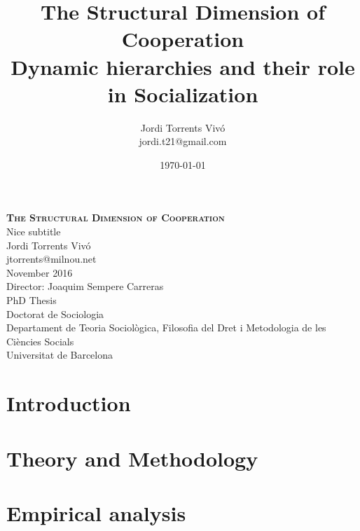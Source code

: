 \documentclass[a4paper,12pt]{memoir}
\title{\Huge {The Structural Dimension of Cooperation}\\ \Large{Dynamic hierarchies and their role in Socialization}}
\author{Jordi Torrents Vivó \\jordi.t21@gmail.com}
\date{\today}
\begin{document}
\begin{titlingpage}
\begin{center}
{\Huge \textsc{\textbf{The Structural Dimension of Cooperation}}}\\[1cm]
{\Huge Nice subtitle}\\[2cm]
{\Large Jordi Torrents Vivó} \\
{\large jtorrents@milnou.net}\\[1cm]
{\Large November 2016}\\[7cm]
{\large Director:  \Large Joaquim Sempere Carreras} \\[1.5cm]
{\LARGE PhD Thesis}\\[0.5cm]
{\LARGE Doctorat de Sociologia}\\[1cm]
{\Large Departament de Teoria Sociològica, Filosofia del Dret i Metodologia de les Ciències Socials} \\[0.5cm]
{\LARGE Universitat de Barcelona}\\
\end{center}
\end{titlingpage}
\cleardoublepage

{}
\setcounter{tocdepth}{3}
\tableofcontents
\newpage
\listoffigures
\newpage
\listoftables
\newpage


\part{Introduction}



\part{Theory and Methodology}





\part{Empirical analysis}


\end{document}
